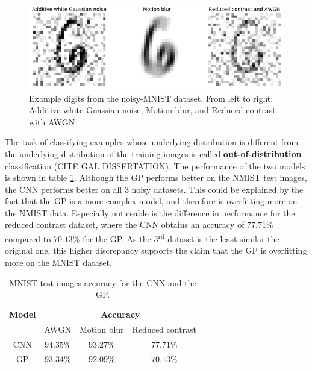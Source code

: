\documentclass{article}
\begin{document}
\begin{figure}[h]
	\centering
	\includegraphics[scale=0.3]{noisy_mnist_example}
	\caption{Example digits from the noisy-MNIST dataset. From left to right: Additive white Guassian noise, Motion blur, and Reduced contrast with AWGN}
	\label{fig/noisy_mnist_example}
\end{figure}

The task of classifying examples whose underlying distribution is different from the underlying distribution of the training images is called \textbf{out-of-distribution} classification (CITE GAL DISSERTATION). The performance of the two models is shown in table \ref{table/noisy_mnist_acc}. Although the GP performs better on the NMIST test images, the CNN performs better on all 3 noisy datasets. This could be explained by the fact that the GP is a more complex model, and therefore is overfitting more on the NMIST data. Especially noticeable is the difference in performance for the reduced contrast dataset, where the CNN obtains an accuracy of $77.71\%$ compared to $70.13\%$ for the GP. As the 3\textsuperscript{rd} dataset is the least similar the original one, this higher discrepancy supports the claim that the GP is overfitting more on the MNIST dataset.

\begin{table}[h]
\centering	
{\renewcommand{\arraystretch}{1.4} %
\begin{tabular}{ c | c c c}
\textbf{Model} & \multicolumn{3}{c}{\textbf{Accuracy}}\\
& AWGN & Motion blur & Reduced contrast\\
\hline
CNN & $94.35\%$ & $93.27\%$ & $77.71\%$ \\
GP & $93.34\%$  & $92.09\%$ & $70.13\%$ \\
\end{tabular}
}
\caption{MNIST test images accuracy for the CNN and the GP.}
\label{table/noisy_mnist_acc}
\end{table}
\end{document}
